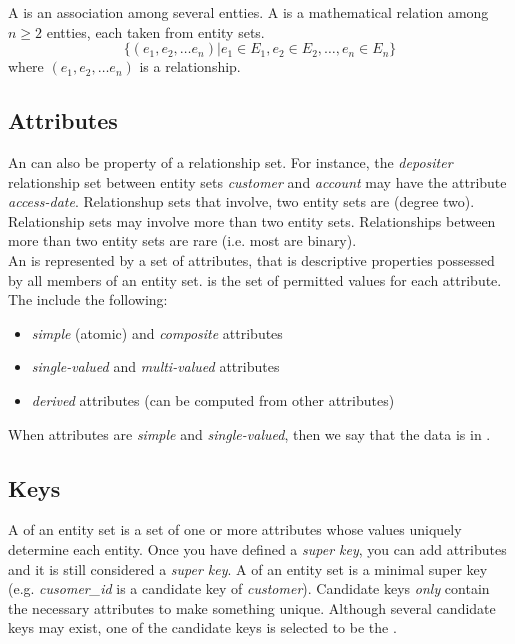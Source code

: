 \documentclass{article}
\begin{document}
A  is an association among several entties. A  is a mathematical relation among $n \geq 2$ entties, each taken from entity sets. $$\{(e_1, e_2, \dots e_n) \vert e_1 \in E_1, e_2 \in E_2, \dots, e_n \in E_n\}$$ where $(e_1 , e_2 , \dots e_n)$ is a relationship. \\ 

\subsection{Attributes}

An  can also be property of a relationship set. For instance, the \emph{depositer} relationship set between entity sets \emph{customer} and \emph{account} may have the attribute \emph{access-date}. Relationshup sets that involve, two entity sets are  (degree two). Relationship sets may involve more than two entity sets. Relationships between more than two entity sets are rare (i.e. most are binary). \\ 

An  is represented by a set of attributes, that is descriptive properties possessed by all members of an entity set.  is the set of permitted values for each attribute. The  include the following:

\begin{itemize}
  \item \emph{simple} (atomic) and \emph{composite} attributes 
  \item \emph{single-valued} and \emph{multi-valued} attributes
  \item \emph{derived} attributes (can be computed from other attributes)
\end{itemize}

When attributes are \emph{simple} and \emph{single-valued}, then we say that the data is in . 

\subsection{Keys}

A  of an entity set is a set of one or more attributes whose values uniquely determine each entity. Once you have defined a \emph{super key}, you can add attributes and it is still considered a \emph{super key}. A  of an entity set is a minimal super key (e.g. \emph{cusomer\_id} is a candidate key of \emph{customer}). Candidate keys \emph{only} contain the necessary attributes to make something unique. Although several candidate keys may exist, one of the candidate keys is selected to be the . \\ 
\end{document}
